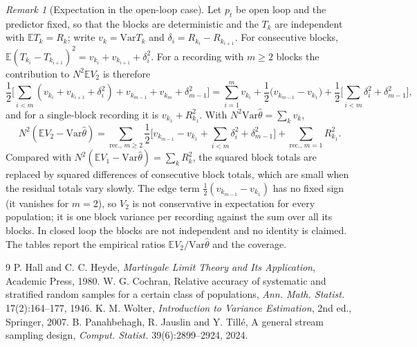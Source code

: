 \documentclass[11pt]{article}
\theoremstyle{remark}
\newtheorem{remark}{Remark}
\newcommand{\E}{\mathbb{E}}
\newcommand{\Var}{\mathrm{Var}}
\newcommand{\hth}{\hat\theta}
\begin{document}
\begin{remark}[Expectation in the open-loop case]\label{rem:v2}
Let $p_t$ be open loop and the predictor fixed, so that the blocks are deterministic and the $T_k$ are independent with $\E T_k=R_k$; write $v_k=\Var T_k$ and $\delta_i=R_{k_i}-R_{k_{i+1}}$. For consecutive blocks, $\E(T_{k_i}-T_{k_{i+1}})^2=v_{k_i}+v_{k_{i+1}}+\delta_i^2$. For a recording with $m\ge2$ blocks the contribution to $N^2\E V_2$ is therefore
\[
\frac12\Big[\sum_{i<m}(v_{k_i}+v_{k_{i+1}}+\delta_i^2)+v_{k_{m-1}}+v_{k_m}+\delta_{m-1}^2\Big]
=\sum_{i=1}^mv_{k_i}+\frac12\big(v_{k_{m-1}}-v_{k_1}\big)+\frac12\Big[\sum_{i<m}\delta_i^2+\delta_{m-1}^2\Big],
\]
and for a single-block recording it is $v_{k_1}+R_{k_1}^2$. With $N^2\Var\hth=\sum_kv_k$,
\[
N^2(\E V_2-\Var\hth)=\sum_{\text{rec.},\,m\ge2}\frac12\Big[v_{k_{m-1}}-v_{k_1}+\sum_{i<m}\delta_i^2+\delta_{m-1}^2\Big]+\sum_{\text{rec.},\,m=1}R_{k_1}^2 .
\]
Compared with $N^2(\E V_1-\Var\hth)=\sum_kR_k^2$, the squared block totals are replaced by squared differences of consecutive block totals, which are small when the residual totals vary slowly. The edge term $\tfrac12(v_{k_{m-1}}-v_{k_1})$ has no fixed sign (it vanishes for $m=2$), so $V_2$ is not conservative in expectation for every population; it is one block variance per recording against the sum over all its blocks. In closed loop the blocks are not independent and no identity is claimed. The tables report the empirical ratios $\E V_2/\Var\hth$ and the coverage.
\end{remark}


\begin{thebibliography}{9}
 P. Hall and C. C. Heyde, \emph{Martingale Limit Theory and Its Application}, Academic Press, 1980.
 W. G. Cochran, Relative accuracy of systematic and stratified random samples for a certain class of populations, \emph{Ann. Math. Statist.} 17(2):164--177, 1946.
 K. M. Wolter, \emph{Introduction to Variance Estimation}, 2nd ed., Springer, 2007.
 B. Panahbehagh, R. Jauslin and Y. Till\'e, A general stream sampling design, \emph{Comput. Statist.} 39(6):2899--2924, 2024.
\end{thebibliography}
\end{document}
